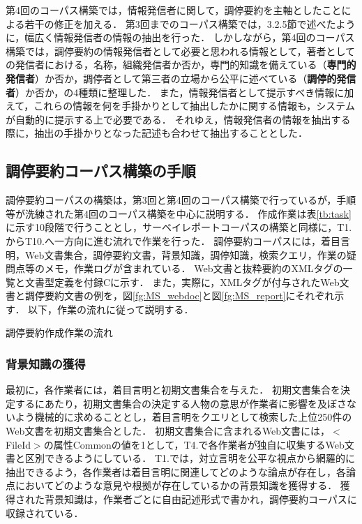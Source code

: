 \documentclass[japanese]{jnlp_1.4}
\begin{document}
第4回のコーパス構築では，情報発信者に関して，調停要約を主軸としたことによる若干の修正を加える．
第3回までのコーパス構築では，3.2.5節で述べたように，幅広く情報発信者の情報の抽出を行った．
しかしながら，第4回のコーパス構築では，調停要約の情報発信者として必要と思われる情報として，著者としての発信者における，名称，組織発信者か否か，専門的知識を備えている（{\bf 専門的発信者}）か否か，調停者として第三者の立場から公平に述べている（{\bf 調停的発信者}）か否か，の4種類に整理した．
また，情報発信者として提示すべき情報に加えて，これらの情報を何を手掛かりとして抽出したかに関する情報も，システムが自動的に提示する上で必要である．
それゆえ，情報発信者の情報を抽出する際に，抽出の手掛かりとなった記述も合わせて抽出することとした．


\subsection{調停要約コーパス構築の手順}
\label{ssc:mediatory_summary_step}


調停要約コーパスの構築は，第3回と第4回のコーパス構築で行っているが，手順等が洗練された第4回のコーパス構築を中心に説明する．
作成作業は表\ref{tb:task}に示す10段階で行うこととし，サーベイレポートコーパスの構築と同様に，T1.からT10.へ一方向に進む流れで作業を行った．
調停要約コーパスには，着目言明，Web文書集合，調停要約文書，背景知識，調停知識，検索クエリ，作業の疑問点等のメモ，作業ログが含まれている．
{Web文書}と抜粋要約のXMLタグの一覧と文書型定義を付録Cに示す．
また，{実際に}，XMLタグが付与されたWeb文書と調停要約文書の例を，図\ref{fg:MS_webdoc}と図\ref{fg:MS_report}にそれぞれ示す．
以下，作業の流れに従って説明する．

\begin{table}[t]
 \caption{調停要約作成作業の流れ}
 \label{tb:task}

\end{table}


\subsubsection{背景知識の獲得}

{最初}に，各作業者には，着目言明と初期文書集合を与えた．
初期文書集合を決定するにあたり，初期文書集合の決定する人物の意思が作業者に影響を及ぼさないよう機械的に求めることとし，着目言明をクエリとして検索した上位250件のWeb文書を初期文書集合とした．
初期文書集合に含まれるWeb文書には，{\sf $<$FileId$>$}の属性{\sf Common}の値を1として，T4.で各作業者が独自に収集するWeb文書と区別できるようにしている．
T1.では，対立言明を公平な視点から網羅的に抽出できるよう，各作業者は着目言明に関連してどのような論点が存在し，各論点においてどのような意見や根拠が存在しているかの背景知識を獲得する．
獲得された背景知識は，作業者ごとに自由記述形式で書かれ，調停要約コーパスに収録されている．
\end{document}
